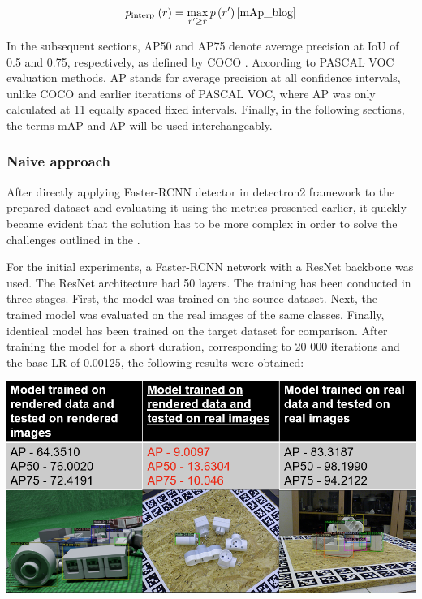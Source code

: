 \documentclass[english, 12pt, a4paper, elec, utf8, a-1b, online]{aaltothesis}
\begin{document}
\begin{equation}
p_{\text {interp }}(r)=\max _{r^{\prime} \geq r} p\left(r^{\prime}\right)
\label{interp}
\cite{mAp_blog}  
\end{equation}

In the subsequent sections, AP50 and AP75 denote average precision at IoU of 0.5 and 0.75, respectively, as defined by COCO \cite{Lin2014}. According to PASCAL VOC \cite{Everingham10} evaluation methods, AP stands for average precision at all confidence intervals, unlike COCO \cite{Lin2014} and earlier iterations of PASCAL VOC, where AP was only calculated at 11 equally spaced fixed intervals. Finally, in the following sections, the terms mAP and AP will be used interchangeably. 


\subsubsection{Naive approach}
\label{naive} 
After directly applying Faster-RCNN detector\cite{ima} in detectron2 \cite{wu2019detectron2} framework to the prepared dataset and evaluating it using the metrics presented earlier, it quickly became evident that the solution has to be more complex in order to solve the challenges outlined in the . 

For the initial experiments, a Faster-RCNN network with a ResNet backbone was used. The ResNet architecture had 50 layers. The training has been conducted in three stages. First, the model was trained on the source dataset. Next, the trained model was evaluated on the real images of the same classes. Finally, identical model has been trained on the target dataset for comparison. After training the model for a short duration, corresponding to 20 000 iterations and the base LR of 0.00125, the following results were obtained: 

\begin{table}[htb]
	\begin{center}
		\includegraphics[width=14cm]{./initialExp.png}
	\end{center}
	\begin{center}
		\label{faster_init}
	\end{center}
\end{table}
\FloatBarrier
\end{document}
